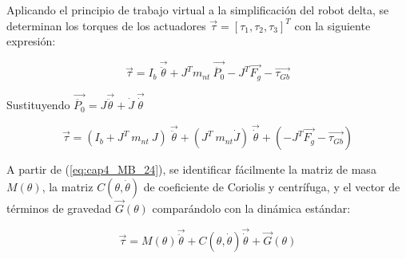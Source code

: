         Aplicando el principio de trabajo virtual a la simplificación del robot delta, se determinan los torques de los actuadores  $ \overrightarrow{ \tau}= \left[  \tau_{1}, \tau_{2}, \tau_{3} \right] ^{T} $  con la siguiente expresión:
        
        \begin{equation}
             \overrightarrow{ \tau}=I_{b}~\overrightarrow{\ddot{ \theta }}+J^{T}m_{nt}~\overrightarrow{\ddot{P_{0}}}- J^{T}\overrightarrow{F_{g}}-\overrightarrow{ \tau_{Gb}} 
            \label{eq:cap4_MB_23}
        \end{equation}
        
        Sustituyendo  $ \overrightarrow{\ddot{P_{0}}}=J\overrightarrow{\ddot{ \theta }}+\dot{J}~\overrightarrow{\dot{ \theta }} $
        
        \begin{equation}
              \overrightarrow{ \tau}= \left( I_{b}+J^{T}~m_{nt}~J \right) ~\overrightarrow{\ddot{ \theta }}+ \left( J^{T}~m_{nt}\dot{J} \right) ~\overrightarrow{\dot{ \theta }}+ \left( - J^{T}\overrightarrow{F_{g}}-\overrightarrow{ \tau_{Gb}} \right)  
              \label{eq:cap4_MB_24}
        \end{equation}
        
        
        A partir de (\ref{eq:cap4_MB_24}), se identificar fácilmente la matriz de masa  $ M \left(  \theta  \right)$, la matriz  $ C \left(  \theta ,\dot{ \theta } \right)  $  de coeficiente de Coriolis y centrífuga, y el vector de términos de gravedad  $ \overrightarrow{G} \left(  \theta  \right)  $  comparándolo con la dinámica estándar:
        
        \begin{equation}
              \overrightarrow{ \tau}=M \left(  \theta  \right) \overrightarrow{\ddot{ \theta }}+C \left(  \theta ,\dot{ \theta } \right) \overrightarrow{\dot{ \theta }}+ \overrightarrow{G} \left(  \theta  \right) 
                \label{eq:cap4_MB_25}
        \end{equation}
        
